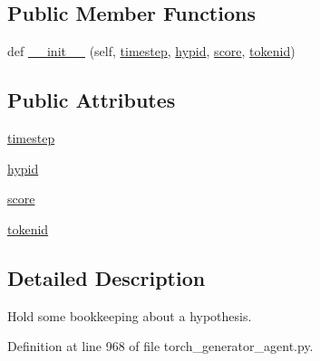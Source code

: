 \subsection*{Public Member Functions}
\begin{DoxyCompactItemize}
\item 
def \hyperlink{classparlai_1_1core_1_1torch__generator__agent_1_1__HypothesisTail_a126c399a12a4e57d6dffaf78a27f129c}{\+\_\+\+\_\+init\+\_\+\+\_\+} (self, \hyperlink{classparlai_1_1core_1_1torch__generator__agent_1_1__HypothesisTail_a93efff1b214a2d98848f8b3d4bf59367}{timestep}, \hyperlink{classparlai_1_1core_1_1torch__generator__agent_1_1__HypothesisTail_a4957647a4492d6cdca0c2f61cce123d5}{hypid}, \hyperlink{classparlai_1_1core_1_1torch__generator__agent_1_1__HypothesisTail_a40f7d1630bf982c5206d8f3a86fd1d3c}{score}, \hyperlink{classparlai_1_1core_1_1torch__generator__agent_1_1__HypothesisTail_a354a80abd13b7da3fd1d116c639a4f1a}{tokenid})
\end{DoxyCompactItemize}
\subsection*{Public Attributes}
\begin{DoxyCompactItemize}
\item 
\hyperlink{classparlai_1_1core_1_1torch__generator__agent_1_1__HypothesisTail_a93efff1b214a2d98848f8b3d4bf59367}{timestep}
\item 
\hyperlink{classparlai_1_1core_1_1torch__generator__agent_1_1__HypothesisTail_a4957647a4492d6cdca0c2f61cce123d5}{hypid}
\item 
\hyperlink{classparlai_1_1core_1_1torch__generator__agent_1_1__HypothesisTail_a40f7d1630bf982c5206d8f3a86fd1d3c}{score}
\item 
\hyperlink{classparlai_1_1core_1_1torch__generator__agent_1_1__HypothesisTail_a354a80abd13b7da3fd1d116c639a4f1a}{tokenid}
\end{DoxyCompactItemize}


\subsection{Detailed Description}
\begin{DoxyVerb}Hold some bookkeeping about a hypothesis.
\end{DoxyVerb}
 

Definition at line 968 of file torch\+\_\+generator\+\_\+agent.\+py.



